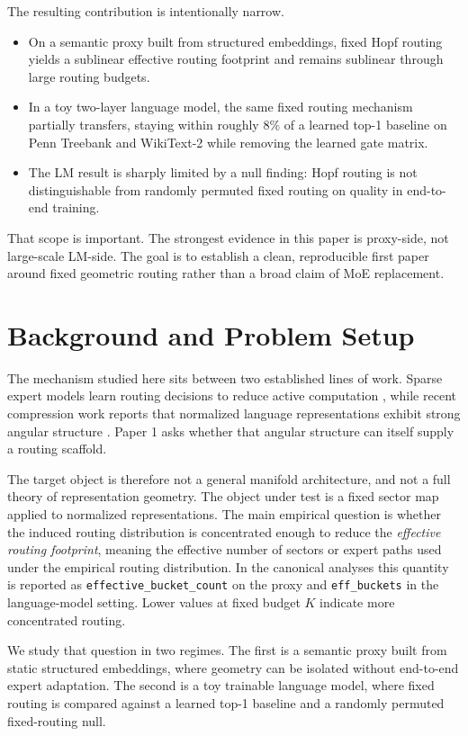 \documentclass[10pt,twocolumn]{article}
\begin{document}
The resulting contribution is intentionally narrow.
\begin{itemize}
\item On a semantic proxy built from structured embeddings, fixed Hopf routing yields a sublinear effective routing footprint and remains sublinear through large routing budgets.
\item In a toy two-layer language model, the same fixed routing mechanism partially transfers, staying within roughly $8\%$ of a learned top-1 baseline on Penn Treebank and WikiText-2 while removing the learned gate matrix.
\item The LM result is sharply limited by a null finding: Hopf routing is not distinguishable from randomly permuted fixed routing on quality in end-to-end training.
\end{itemize}

That scope is important. The strongest evidence in this paper is proxy-side, not large-scale LM-side. The goal is to establish a clean, reproducible first paper around fixed geometric routing rather than a broad claim of MoE replacement.

\section{Background and Problem Setup}
The mechanism studied here sits between two established lines of work. Sparse expert models learn routing decisions to reduce active computation \citep{shazeer2017outrageously,fedus2022switch}, while recent compression work reports that normalized language representations exhibit strong angular structure \citep{turboquant2026}. Paper 1 asks whether that angular structure can itself supply a routing scaffold.

The target object is therefore not a general manifold architecture, and not a full theory of representation geometry. The object under test is a fixed sector map applied to normalized representations. The main empirical question is whether the induced routing distribution is concentrated enough to reduce the \emph{effective routing footprint}, meaning the effective number of sectors or expert paths used under the empirical routing distribution. In the canonical analyses this quantity is reported as \texttt{effective\_bucket\_count} on the proxy and \texttt{eff\_buckets} in the language-model setting. Lower values at fixed budget $K$ indicate more concentrated routing.

We study that question in two regimes. The first is a semantic proxy built from static structured embeddings, where geometry can be isolated without end-to-end expert adaptation. The second is a toy trainable language model, where fixed routing is compared against a learned top-1 baseline and a randomly permuted fixed-routing null.
\end{document}
